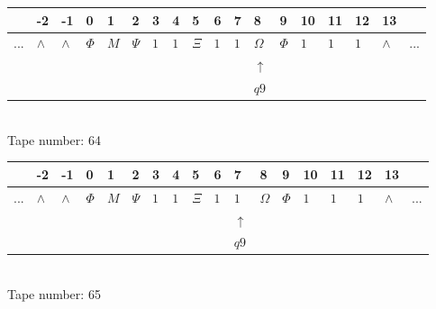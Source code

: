 \documentclass[11pt]{article}
\begin{document}
\begin{table}[H]
\centering
\begin{tabular}{llllllllllllllllll}
 & -2 & -1 & 0 & 1 & 2 & 3 & 4 & 5 & 6 & 7 & 8 & 9 & 10 & 11 & 12 & 13 & \\
\hline
$...$ & \multicolumn{1}{|l|}{$\wedge$} & \multicolumn{1}{|l|}{$\wedge$} & \multicolumn{1}{|l|}{$\Phi$} & \multicolumn{1}{|l|}{$M$} & \multicolumn{1}{|l|}{$\Psi$} & \multicolumn{1}{|l|}{$1$} & \multicolumn{1}{|l|}{$1$} & \multicolumn{1}{|l|}{$\Xi$} & \multicolumn{1}{|l|}{$1$} & \multicolumn{1}{|l|}{$1$} & \multicolumn{1}{|l|}{$\Omega$} & \multicolumn{1}{|l|}{$\Phi$} & \multicolumn{1}{|l|}{$1$} & \multicolumn{1}{|l|}{$1$} & \multicolumn{1}{|l|}{$1$} & \multicolumn{1}{|l|}{$\wedge$} & $...$\\
\hline
&  &  &  &  &  &  &  &  &  &  & $\uparrow$ &  &  &  &  &  &  \\
&  &  &  &  &  &  &  &  &  &  & $ q9 $ &  &  &  &  &  &  \\
\end{tabular}
\\
Tape number: 64
\noindent\makebox[\linewidth]{\hdashrule{\textwidth}{1pt}{1pt}}\end{table}

\begin{table}[H]
\centering
\begin{tabular}{llllllllllllllllll}
 & -2 & -1 & 0 & 1 & 2 & 3 & 4 & 5 & 6 & 7 & 8 & 9 & 10 & 11 & 12 & 13 & \\
\hline
$...$ & \multicolumn{1}{|l|}{$\wedge$} & \multicolumn{1}{|l|}{$\wedge$} & \multicolumn{1}{|l|}{$\Phi$} & \multicolumn{1}{|l|}{$M$} & \multicolumn{1}{|l|}{$\Psi$} & \multicolumn{1}{|l|}{$1$} & \multicolumn{1}{|l|}{$1$} & \multicolumn{1}{|l|}{$\Xi$} & \multicolumn{1}{|l|}{$1$} & \multicolumn{1}{|l|}{$1$} & \multicolumn{1}{|l|}{$\Omega$} & \multicolumn{1}{|l|}{$\Phi$} & \multicolumn{1}{|l|}{$1$} & \multicolumn{1}{|l|}{$1$} & \multicolumn{1}{|l|}{$1$} & \multicolumn{1}{|l|}{$\wedge$} & $...$\\
\hline
&  &  &  &  &  &  &  &  &  & $\uparrow$ &  &  &  &  &  &  &  \\
&  &  &  &  &  &  &  &  &  & $ q9 $ &  &  &  &  &  &  &  \\
\end{tabular}
\\
Tape number: 65
\noindent\makebox[\linewidth]{\hdashrule{\textwidth}{1pt}{1pt}}\end{table}
\clearpage
\end{document}
